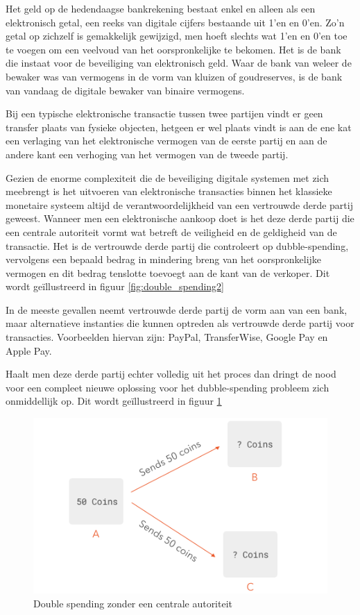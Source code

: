 			Het geld op de hedendaagse bankrekening bestaat enkel en alleen als een elektronisch getal, een reeks van digitale cijfers bestaande uit 1’en en 0’en. Zo’n getal op zichzelf is gemakkelijk gewijzigd, men hoeft slechts wat 1’en en 0’en toe te voegen om een veelvoud van het oorspronkelijke te bekomen. Het is de bank die instaat voor de beveiliging van elektronisch geld. Waar de bank van weleer de bewaker was van vermogens in de vorm van kluizen of goudreserves, is de bank van vandaag de digitale bewaker van binaire vermogens.
			
			Bij een typische elektronische transactie tussen twee partijen vindt er geen transfer plaats van fysieke objecten, hetgeen er wel plaats vindt is aan de ene kat een verlaging van het elektronische vermogen van de eerste partij en aan de andere kant een verhoging van het vermogen van de tweede partij. 
		
			Gezien de enorme complexiteit die de beveiliging digitale systemen met zich meebrengt is het uitvoeren van elektronische transacties binnen het klassieke monetaire systeem altijd de verantwoordelijkheid van een vertrouwde derde partij geweest. Wanneer men een elektronische aankoop doet is het deze derde partij die een centrale autoriteit vormt wat betreft de veiligheid en de geldigheid van de transactie. Het is de vertrouwde derde partij die controleert op dubble-spending, vervolgens een bepaald bedrag in mindering breng van het oorspronkelijke vermogen en dit bedrag tenslotte toevoegt aan de kant van de verkoper. Dit wordt geïllustreerd in figuur \ref{fig:double_spending2}
			
			In de meeste gevallen neemt vertrouwde derde partij de vorm aan van een bank, maar alternatieve instanties die kunnen optreden als vertrouwde derde partij voor transacties. Voorbeelden hiervan zijn: PayPal, TransferWise, Google Pay en Apple Pay.
		
			Haalt men deze derde partij echter volledig uit het proces dan dringt de nood voor een compleet nieuwe oplossing voor het dubble-spending probleem zich onmiddellijk op.  Dit wordt geïllustreerd in figuur \ref{fig:double_spending1}
			
			\begin{figure}
				\includegraphics[width=\linewidth]{img/double_spending1.png}
				\caption{Double spending zonder een centrale autoriteit}
				\label{fig:double_spending1}
			\end{figure}
		
